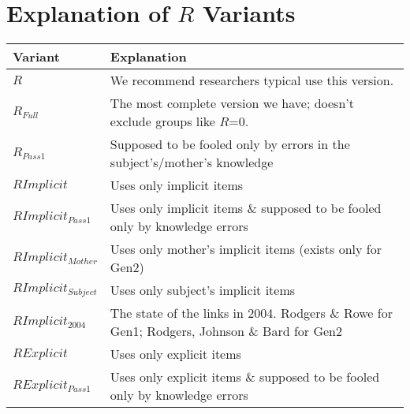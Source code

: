 \documentclass{article}\usepackage{graphicx, color}
\begin{document}
\section{Explanation of $R$ Variants}
\begin{tabular}{l l}
\textbf{Variant} & \textbf{Explanation} \\
\hline
$R$ & We recommend researchers typical use this version. \\
$R_{Full}$ & The most complete version we have; doesn't exclude groups like $R$=0. \\
$R_{Pass1}$ & Supposed to be fooled only by errors in the subject's/mother's knowledge \\
\hline
$RImplicit$ & Uses only implicit items \\
$RImplicit_{Pass1}$ & Uses only implicit items \& supposed to be fooled only by knowledge errors \\
$RImplicit_{Mother}$ & Uses only mother's implicit items (exists only for Gen2)\\
$RImplicit_{Subject}$ & Uses only subject's implicit items\\
$RImplicit_{2004}$ & The state of the links in 2004.  Rodgers \& Rowe for Gen1; Rodgers, Johnson \& Bard for Gen2 \\
\hline
$RExplicit$ & Uses only explicit items \\
$RExplicit_{Pass1}$ & Uses only explicit items \& supposed to be fooled only by knowledge errors \\

\hline
\end{tabular}
\end{document}
